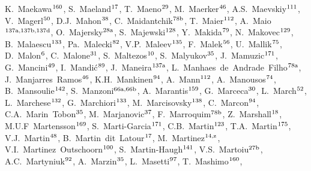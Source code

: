 \begin{flushleft}
K.~Maekawa$^\textrm{\scriptsize 160}$,    
S.~Maeland$^\textrm{\scriptsize 17}$,    
T.~Maeno$^\textrm{\scriptsize 29}$,    
M.~Maerker$^\textrm{\scriptsize 46}$,    
A.S.~Maevskiy$^\textrm{\scriptsize 111}$,    
V.~Magerl$^\textrm{\scriptsize 50}$,    
D.J.~Mahon$^\textrm{\scriptsize 38}$,    
C.~Maidantchik$^\textrm{\scriptsize 78b}$,    
T.~Maier$^\textrm{\scriptsize 112}$,    
A.~Maio$^\textrm{\scriptsize 137a,137b,137d}$,    
O.~Majersky$^\textrm{\scriptsize 28a}$,    
S.~Majewski$^\textrm{\scriptsize 128}$,    
Y.~Makida$^\textrm{\scriptsize 79}$,    
N.~Makovec$^\textrm{\scriptsize 129}$,    
B.~Malaescu$^\textrm{\scriptsize 133}$,    
Pa.~Malecki$^\textrm{\scriptsize 82}$,    
V.P.~Maleev$^\textrm{\scriptsize 135}$,    
F.~Malek$^\textrm{\scriptsize 56}$,    
U.~Mallik$^\textrm{\scriptsize 75}$,    
D.~Malon$^\textrm{\scriptsize 6}$,    
C.~Malone$^\textrm{\scriptsize 31}$,    
S.~Maltezos$^\textrm{\scriptsize 10}$,    
S.~Malyukov$^\textrm{\scriptsize 35}$,    
J.~Mamuzic$^\textrm{\scriptsize 171}$,    
G.~Mancini$^\textrm{\scriptsize 49}$,    
I.~Mandi\'{c}$^\textrm{\scriptsize 89}$,    
J.~Maneira$^\textrm{\scriptsize 137a}$,    
L.~Manhaes~de~Andrade~Filho$^\textrm{\scriptsize 78a}$,    
J.~Manjarres~Ramos$^\textrm{\scriptsize 46}$,    
K.H.~Mankinen$^\textrm{\scriptsize 94}$,    
A.~Mann$^\textrm{\scriptsize 112}$,    
A.~Manousos$^\textrm{\scriptsize 74}$,    
B.~Mansoulie$^\textrm{\scriptsize 142}$,    
S.~Manzoni$^\textrm{\scriptsize 66a,66b}$,    
A.~Marantis$^\textrm{\scriptsize 159}$,    
G.~Marceca$^\textrm{\scriptsize 30}$,    
L.~March$^\textrm{\scriptsize 52}$,    
L.~Marchese$^\textrm{\scriptsize 132}$,    
G.~Marchiori$^\textrm{\scriptsize 133}$,    
M.~Marcisovsky$^\textrm{\scriptsize 138}$,    
C.~Marcon$^\textrm{\scriptsize 94}$,    
C.A.~Marin~Tobon$^\textrm{\scriptsize 35}$,    
M.~Marjanovic$^\textrm{\scriptsize 37}$,    
F.~Marroquim$^\textrm{\scriptsize 78b}$,    
Z.~Marshall$^\textrm{\scriptsize 18}$,    
M.U.F~Martensson$^\textrm{\scriptsize 169}$,    
S.~Marti-Garcia$^\textrm{\scriptsize 171}$,    
C.B.~Martin$^\textrm{\scriptsize 123}$,    
T.A.~Martin$^\textrm{\scriptsize 175}$,    
V.J.~Martin$^\textrm{\scriptsize 48}$,    
B.~Martin~dit~Latour$^\textrm{\scriptsize 17}$,    
M.~Martinez$^\textrm{\scriptsize 14,z}$,    
V.I.~Martinez~Outschoorn$^\textrm{\scriptsize 100}$,    
S.~Martin-Haugh$^\textrm{\scriptsize 141}$,    
V.S.~Martoiu$^\textrm{\scriptsize 27b}$,    
A.C.~Martyniuk$^\textrm{\scriptsize 92}$,    
A.~Marzin$^\textrm{\scriptsize 35}$,    
L.~Masetti$^\textrm{\scriptsize 97}$,    
T.~Mashimo$^\textrm{\scriptsize 160}$,    

\end{flushleft}
